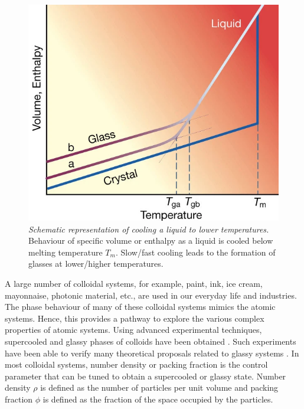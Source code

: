     \begin{figure}[hbt!]
	\includegraphics[width=12cm]{figs/fig_glassFormation.png}
	\centering
	\caption[{\em Schematic representation of cooling a liquid to lower temperatures}]{{\em Schematic representation of cooling a liquid to lower temperatures.} Behaviour of specific volume or enthalpy as a liquid is cooled below melting temperature $T_m$. Slow/fast cooling leads to the formation of glasses at lower/higher temperatures. \cite{debenedetti2001supercooled}\label{fig_glassFormation}}
    \end{figure}



A large number of colloidal systems, for example, paint, ink, ice cream, mayonnaise, photonic material, etc., are used in our everyday life and industries. The phase behaviour of many of these colloidal systems mimics the atomic systems. Hence, this provides a pathway to explore the various complex properties of atomic systems. Using advanced experimental techniques, supercooled and glassy phases of colloids have been obtained \cite{hunter2012physics}. Such experiments have been able to verify many theoretical proposals related to glassy systems \cite{hima2015direct}. In most colloidal systems, number density or packing fraction is the control parameter that can be tuned to obtain a supercooled or glassy state. Number density $\rho$ is defined as the number of particles per unit volume and packing fraction $\phi$ is defined as the fraction of the space occupied by the particles.


